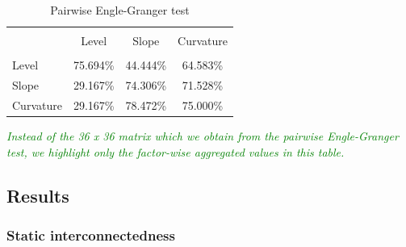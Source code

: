 \documentclass[12pt,bibliography=totoc]{article}
\begin{document}
\begin{table}[H]
\caption{Pairwise Engle-Granger test} %

\centering%
\begin{tabular}{l | ccc}%
\hline\hline \\ [-1.5ex]                         %

	&	Level 	&	Slope	&	Curvature	\\
\hline \\ [-1.5ex]  
Level	&	75.694\%	&	44.444\%	&	64.583\%	\\
Slope	&	29.167\%	&	74.306\%	&	71.528\%	\\
Curvature	&	29.167\%	&	78.472\%	&	75.000\%	\\

\hline            





\end{tabular}
\label{table:nonlin}%
\end{table}

    \begin{tablenotes}
      \small
      \item \textcolor{green}{\textit{Instead of the 36 x 36 matrix which we obtain from the pairwise Engle-Granger test, we highlight only the factor-wise aggregated values in this table.}}
    \end{tablenotes}


\newpage

\subsection{Results}

\subsubsection{Static interconnectedness}

\end{document}
